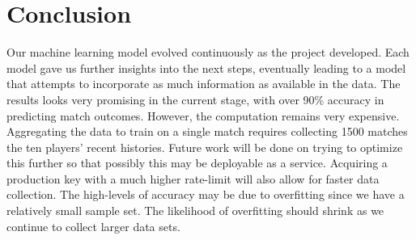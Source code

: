 \section{Conclusion}
Our machine learning model evolved continuously as the project developed.  Each model gave us further insights into the next steps, eventually leading to a model that attempts to incorporate as much information as available in the data.  The results looks very promising in the current stage, with over 90\% accuracy in predicting match outcomes. However, the computation remains very expensive.  Aggregating the data to train on a single match requires collecting 1500 matches the ten players' recent histories. Future work will be done on trying to optimize this further so that possibly this may be deployable as a service. Acquiring a production key with a much higher rate-limit will also allow for faster data collection. The high-levels of accuracy may be due to overfitting since we have a relatively small sample set. The likelihood of overfitting should shrink as we continue to collect larger data sets.
